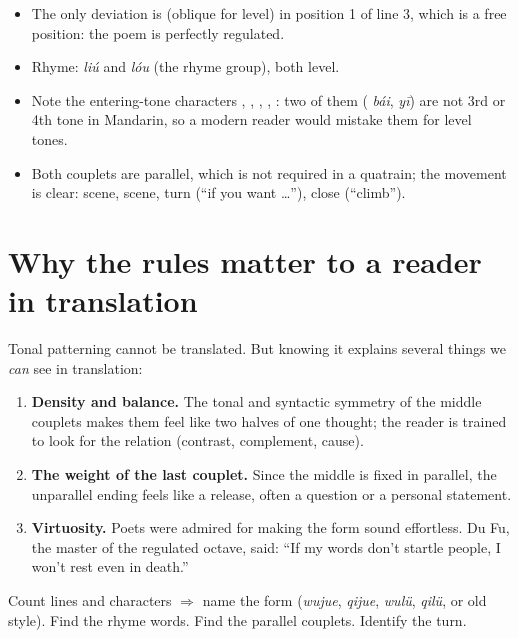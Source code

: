 \begin{itemize}
  \item The only deviation is  (oblique for level) in position 1 of line 3, which is
        a free position: the poem is perfectly regulated.
  \item Rhyme:  \emph{liú} and  \emph{lóu} (the  rhyme group), both level.
  \item Note the entering-tone characters , , , ,
        : two of them ( \emph{bái},  \emph{yī}) are not 3rd or 4th tone in Mandarin, so a modern reader would mistake them for level tones.
  \item Both couplets are parallel, which is not required in a quatrain; the
         movement is clear: scene, scene, turn (``if you want \ldots''),
        close (``climb'').
\end{itemize}

\section{Why the rules matter to a reader in translation}

Tonal patterning cannot be translated. But knowing it explains several things we
\emph{can} see in translation:
\begin{enumerate}
  \item \textbf{Density and balance.} The tonal and syntactic symmetry of the middle
        couplets makes them feel like two halves of one thought; the reader is trained to
        look for the relation (contrast, complement, cause).
  \item \textbf{The weight of the last couplet.} Since the middle is fixed in parallel, the
        unparallel ending feels like a release, often a question or a personal statement.
  \item \textbf{Virtuosity.} Poets were admired for making the form sound effortless.
        Du Fu, the master of the regulated octave, said:  ``If my
        words don't startle people, I won't rest even in death.''
\end{enumerate}

\begin{important}
Count lines and characters $\Rightarrow$ name the form (\emph{wujue}, \emph{qijue},
\emph{wulü}, \emph{qilü}, or old style). Find the rhyme words. Find the parallel
couplets. Identify the turn.
\end{important}

